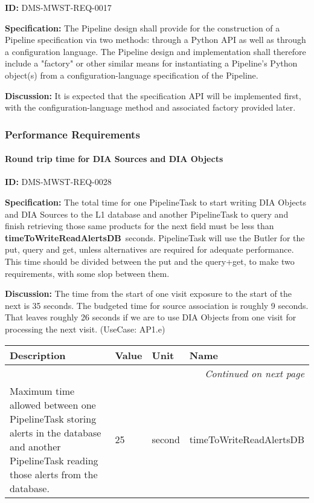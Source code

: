 \documentclass[SE,toc,lsstdraft]{lsstdoc}
\makeatletter
\newcommand{\paramname}[1]{\hspace{0pt}#1}
\newcommand{\unitname}[1]{\hspace{0pt}#1}
\newenvironment{parameters}[0]{%
\setlength\LTleft{0pt}
\setlength\LTright{\fill}
\begin{small}
\begin{longtable}[]{|p{0.49\textwidth}|l|p{0.6in}|p{1.70in}@{}|}

\hline \textbf{Description} & \textbf{Value} & \textbf{Unit} & \textbf{Name} \\ \hline
\endhead

\hline \multicolumn{4}{r}{\emph{Continued on next page}} \\
\endfoot

\hline\hline
\endlastfoot
}{%
\hline
\end{longtable}
\end{small}
}
\makeatother
\begin{document}
\label{DMS-MWST-REQ-0017}
\textbf{ID:} DMS-MWST-REQ-0017

\textbf{Specification:}
The Pipeline design shall provide for the construction of a Pipeline specification via two methods: through a Python API as well as through a configuration language.  The Pipeline design and implementation shall therefore include a "factory" or other similar means for instantiating a Pipeline's Python object(s) from a configuration-language specification of the Pipeline.

\textbf{Discussion:}
It is expected that the specification API will be implemented first, with the configuration-language method and associated factory provided later.

\subsubsection{Performance Requirements}

\paragraph{Round trip time for DIA Sources and DIA Objects}\hfill  %

\label{DMS-MWST-REQ-0028}
\textbf{ID:} DMS-MWST-REQ-0028

\textbf{Specification:}
The total time for one PipelineTask to start writing DIA Objects and DIA Sources to the L1 database and another PipelineTask to query and finish retrieving those same products for the next field must be less than \textbf{timeToWriteReadAlertsDB} seconds. PipelineTask will use the Butler for the put, query and get, unless alternatives are required for adequate performance. This time should be divided between the put and the query+get, to make two requirements, with some slop between them.

\textbf{Discussion:}
The time from the start of one visit exposure to the start of the next is 35 seconds. The budgeted time for source association is roughly 9 seconds. That leaves roughly 26 seconds if we are to use DIA Objects from one visit for processing the next visit. (UseCase: AP1.e)

\begin{parameters}
Maximum time allowed between one PipelineTask storing alerts in the database and another PipelineTask reading those alerts from the database.
&
25
&
\unitname{%
second
}
&
\paramname{%
timeToWriteReadAlertsDB
} \\\hline
\end{parameters}
\end{document}
